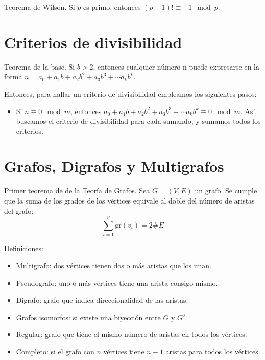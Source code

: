 \documentclass[a4paper]{article}
\begin{document}
Teorema de Wilson. Si $p$ es primo, entonces $(p-1)! \equiv -1 \mod p$.

\section*{Criterios de divisibilidad}

Teorema de la base. Si $b>2$, entonces cualquier número n puede expresarse en la forma $n = a_0 + a_1b + a_2b^2 + a_3b^3 + \cdots a_kb^k$.

Entonces, para hallar un criterio de divisibilidad empleamos los siguientes pasos:
\begin{itemize}
	\item Si $n \equiv 0 \mod m$, entonces $ a_0 + a_1b + a_2b^2 + a_3b^3 + \cdots a_kb^k \equiv 0 \mod m$. Así, buscamos el criterio de divisibilidad para cada sumando, y sumamos todos los criterios.
\end{itemize}


\section*{Grafos, Digrafos y Multigrafos}

Primer teorema de de la Teoría de Grafos. Sea $G=(V,E)$ un grafo. Se cumple que la suma de los grados de los vértices equivale al doble del número de aristas del grafo:
$$\sum_{i=1}^{p} \text{gr}(v_i)=2\#E$$

\hrulefill

Definiciones:
\begin{itemize}
	\item Multigrafo: dos vértices tienen dos o más aristas que los unan.
	\item Pseudografo: uno o más vértices tiene una arista consigo mismo.
	\item Digrafo: grafo que indica direccionalidad de las aristas.
	\item Grafos isomorfos: si existe una biyección entre $G$ y $G'$.
	\item Regular: grafo que tiene el mismo número de aristas en todos los vértices.
	\item Completo: si el grafo con $n$ vértices tiene $n-1$ aristas para todos los vértices.
\end{itemize}
\end{document}
